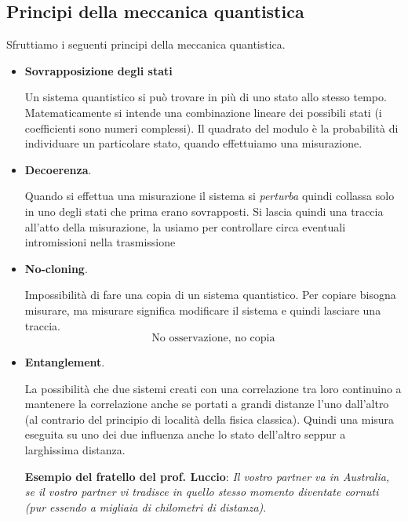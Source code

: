 \subsection{Principi della meccanica quantistica}
Sfruttiamo i seguenti principi della meccanica quantistica.
\begin{itemize}
    \item \textbf{Sovrapposizione degli stati}
    
    Un sistema quantistico si può trovare in più di uno stato allo stesso tempo. Matematicamente si intende una combinazione lineare dei possibili stati (i coefficienti sono numeri complessi). Il quadrato del modulo è la probabilità di individuare un particolare stato, quando effettuiamo una misurazione.
    
    \item \textbf{Decoerenza}.
    
    Quando si effettua una misurazione il sistema si \emph{perturba} quindi collassa solo in uno degli stati che prima erano sovrapposti. Si lascia quindi una traccia all'atto della misurazione, la usiamo per controllare circa eventuali intromissioni nella trasmissione
    
    \item \textbf{No-cloning}.
    
    Impossibilità di fare una copia di un sistema quantistico.
    Per copiare bisogna misurare, ma misurare significa modificare il sistema e quindi lasciare una traccia.
    \[\boxed{\text{No osservazione, no copia}}\]
    
    \item \textbf{Entanglement}.
    
    La possibilità che due sistemi creati con una correlazione tra loro continuino a mantenere la correlazione anche se portati a grandi distanze l'uno dall'altro (al contrario del principio di località della fisica classica). Quindi una misura eseguita su uno dei due influenza anche lo stato dell'altro seppur a larghissima distanza.
    
    \textbf{Esempio del fratello del prof. Luccio}: \emph{Il vostro partner va in Australia, se il vostro partner vi tradisce in quello stesso momento diventate cornuti (pur essendo a migliaia di chilometri di distanza)}.
\end{itemize}


